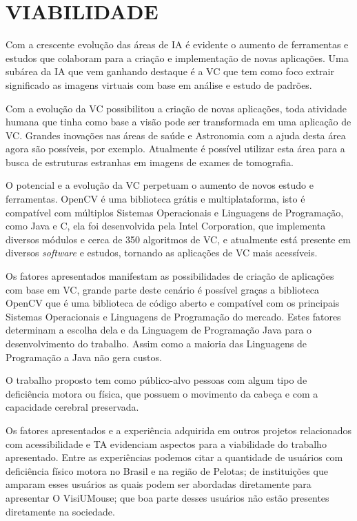 \section{VIABILIDADE}\label{Sub:viabilidade}
Com a crescente evolução das áreas de IA é evidente o aumento de ferramentas e estudos que colaboram para a criação e implementação de novas aplicações. Uma subárea da IA que vem ganhando destaque é a VC que tem como foco extrair significado as imagens virtuais com base em análise e estudo de padrões.

Com a evolução da VC possibilitou a criação de novas aplicações, toda atividade humana que tinha como base a visão pode ser transformada em uma aplicação de VC. Grandes inovações nas áreas de saúde e Astronomia com a ajuda desta área agora são possíveis, por exemplo. Atualmente é possível utilizar esta área para a busca de estruturas estranhas em imagens de exames de tomografia. 
    
O potencial e a evolução da VC perpetuam o aumento de novos estudo e ferramentas. OpenCV é uma biblioteca grátis e multiplataforma, isto é compatível com múltiplos Sistemas Operacionais e Linguagens de Programação, como Java e C, ela foi desenvolvida pela Intel Corporation, que implementa diversos módulos e cerca de 350 algoritmos de VC, e atualmente está presente em diversos \textit{software} e estudos, tornando as aplicações de VC mais acessíveis.  

Os fatores apresentados manifestam as possibilidades de criação de aplicações com base em VC, grande parte deste cenário é possível graças a biblioteca OpenCV que é uma biblioteca de código aberto e compatível com os principais Sistemas Operacionais e Linguagens de Programação do mercado. Estes fatores determinam a escolha dela e da Linguagem de Programação Java para o desenvolvimento do trabalho. Assim como a maioria das Linguagens de Programação a Java não gera custos.

O trabalho proposto tem como público-alvo pessoas com algum tipo de deficiência motora ou física, que possuem o movimento da cabeça e com a capacidade cerebral preservada.

Os fatores apresentados e a experiência adquirida em outros projetos relacionados com acessibilidade e TA evidenciam aspectos para a viabilidade do trabalho apresentado. Entre as experiências podemos citar a quantidade de usuários com deficiência físico motora no Brasil e na região de Pelotas; de instituições que amparam esses usuários as quais podem ser abordadas diretamente para apresentar O VisiUMouse; que boa parte desses usuários não estão presentes diretamente na sociedade.

